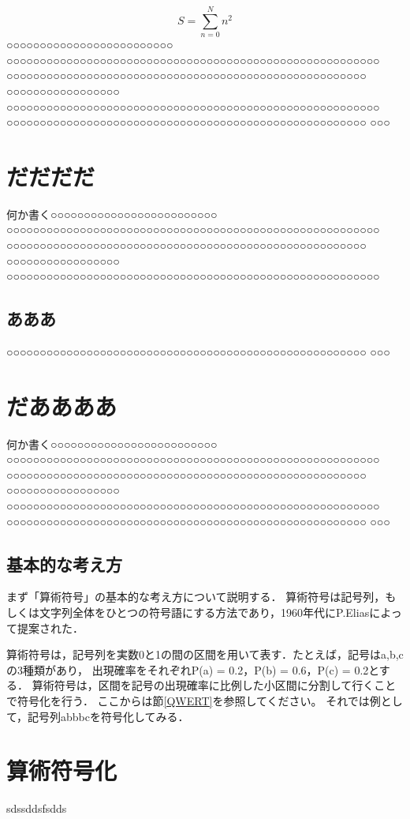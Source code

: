 \begin{equation}
S=\sum_{n=0}^N n^2 \label{eqAAAA}
\end{equation}
○○○○○○○○○○○○○○○○○○○○○○○○○ ○○○○○○○○○○○○○○○○○○○○○○○○○○○○○○○○○○○○○○○○○○○○○○○○○○○○○○○○ ○○○○○○○○○○○○○○○○○○○○○○○○○○○○○○○○○○○○○○○○○○○○○○○○○○○○○○ ○○○○○○○○○○○○○○○○○ ○○○○○○○○○○○○○○○○○○○○○○○○○○○○○○○○○○○○○○○○○○○○○○○○○○○○○○○○ ○○○○○○○○○○○○○○○○○○○○○○○○○○○○○○○○○○○○○○○○○○○○○○○○○○○○○○ ○○○
\section{だだだだ}
何か書く○○○○○○○○○○○○○○○○○○○○○○○○○ ○○○○○○○○○○○○○○○○○○○○○○○○○○○○○○○○○○○○○○○○○○○○○○○○○○○○○○○○ ○○○○○○○○○○○○○○○○○○○○○○○○○○○○○○○○○○○○○○○○○○○○○○○○○○○○○○ ○○○○○○○○○○○○○○○○○ ○○○○○○○○○○○○○○○○○○○○○○○○○○○○○○○○○○○○○○○○○○○○○○○○○○○○○○○○
\subsection{あああ} ○○○○○○○○○○○○○○○○○○○○○○○○○○○○○○○○○○○○○○○○○○○○○○○○○○○○○○ ○○○
\section{だああああ}
何か書く○○○○○○○○○○○○○○○○○○○○○○○○○ ○○○○○○○○○○○○○○○○○○○○○○○○○○○○○○○○○○○○○○○○○○○○○○○○○○○○○○○○ ○○○○○○○○○○○○○○○○○○○○○○○○○○○○○○○○○○○○○○○○○○○○○○○○○○○○○○ ○○○○○○○○○○○○○○○○○ ○○○○○○○○○○○○○○○○○○○○○○○○○○○○○○○○○○○○○○○○○○○○○○○○○○○○○○○○ ○○○○○○○○○○○○○○○○○○○○○○○○○○○○○○○○○○○○○○○○○○○○○○○○○○○○○○ ○○○


\subsection{基本的な考え方}
まず「算術符号」の{\gt 基本的な考え方について説明}する\cite{wavelet-2}．
算術符号は記号列，もしくは{\huge 文字列全体を\gt ひとつの符号語に}する方法であり，1960年代にP.Eliasによって提案された．\par
算術符号は，記号列を実数0と1の間の区間を用いて表す．たとえば，記号は{a,b,c}の3種類があり，
出現確率をそれぞれP(a) = 0.2，P(b) = 0.6，P(c) = 0.2とする．
算術符号は，区間を記号の出現確率に比例した小区間に分割して行くことで符号化を行う．
ここからは節\ref{QWERT}を参照してください。
それでは例として，記号列abbbcを符号化してみる．


\section{算術符号化}
sdssddsfsdds





